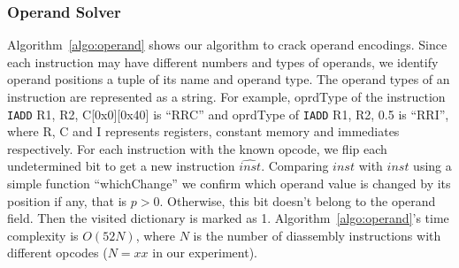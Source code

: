 
\subsubsection{Operand Solver}
Algorithm~\ref{algo:operand} shows our algorithm to crack operand encodings.
Since each instruction may have different numbers and types of operands, we identify operand positions a tuple of its name and operand type. 
The operand types of an instruction are represented as a string.
For example, oprdType of the instruction {\tt IADD} R1, R2, C[0x0][0x40] is ``RRC'' and oprdType of {\tt IADD} R1, R2, 0.5 is ``RRI'', where R, C and I represents registers, constant memory and immediates respectively.
For each instruction with the known opcode, we flip each undetermined bit to get a new instruction $\widehat{inst}$.
Comparing $inst$ with $\widehat{inst}$ using a simple function ``whichChange'' we confirm which operand value is changed by its position if any, that is $p>0$.
Otherwise, this bit doesn't belong to the operand field.
Then the visited dictionary is marked as 1.
Algorithm~\ref{algo:operand}'s time complexity is $O(52N)$, where $N$ is the number of diassembly instructions with different opcodes ($N=xx$ in our experiment).

